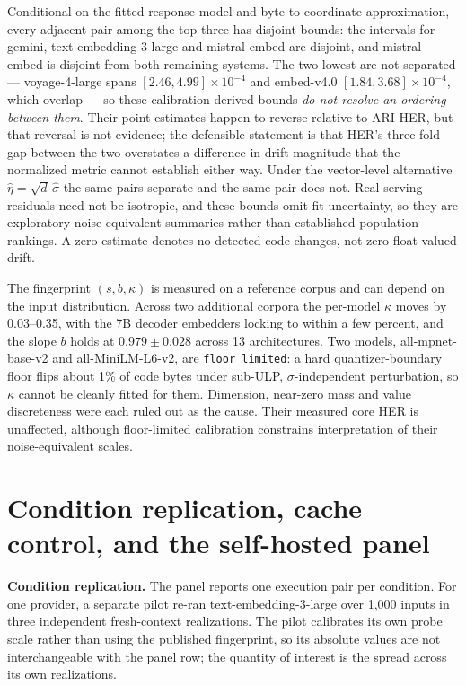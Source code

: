 \documentclass{article}
\begin{document}
Conditional on the fitted response model and byte-to-coordinate approximation, every adjacent pair among the top three has disjoint bounds: the intervals for gemini, text-embedding-3-large and mistral-embed are disjoint, and mistral-embed is disjoint from both remaining systems. The two lowest are not separated --- voyage-4-large spans $[2.46,4.99]\times10^{-4}$ and embed-v4.0 $[1.84,3.68]\times10^{-4}$, which overlap --- so these calibration-derived bounds \emph{do not resolve an ordering between them}. Their point estimates happen to reverse relative to ARI-HER, but that reversal is not evidence; the defensible statement is that HER's three-fold gap between the two overstates a difference in drift magnitude that the normalized metric cannot establish either way. Under the vector-level alternative $\hat\eta=\sqrt d\,\hat\sigma$ the same pairs separate and the same pair does not. Real serving residuals need not be isotropic, and these bounds omit fit uncertainty, so they are exploratory noise-equivalent summaries rather than established population rankings. A zero estimate denotes no detected code changes, not zero float-valued drift.

The fingerprint $(s,b,\kappa)$ is measured on a reference corpus and can depend on the input distribution. Across two additional corpora the per-model $\kappa$ moves by 0.03--0.35, with the 7B decoder embedders locking to within a few percent, and the slope $b$ holds at $0.979\pm0.028$ across 13 architectures. Two models, all-mpnet-base-v2 and all-MiniLM-L6-v2, are \texttt{floor\_limited}: a hard quantizer-boundary floor flips about 1\% of code bytes under sub-ULP, $\sigma$-independent perturbation, so $\kappa$ cannot be cleanly fitted for them. Dimension, near-zero mass and value discreteness were each ruled out as the cause. Their measured core HER is unaffected, although floor-limited calibration constrains interpretation of their noise-equivalent scales.

\section{Condition replication, cache control, and the self-hosted panel}\label{app:selfhosted}

\textbf{Condition replication.} The panel reports one execution pair per condition. For one provider, a separate pilot re-ran text-embedding-3-large over 1{,}000 inputs in three independent fresh-context realizations. The pilot calibrates its own probe scale rather than using the published fingerprint, so its absolute values are not interchangeable with the panel row; the quantity of interest is the spread across its own realizations.
\end{document}
